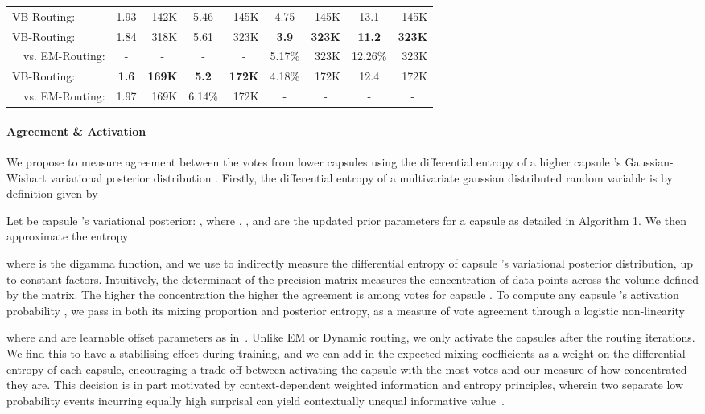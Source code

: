 \documentclass[letterpaper]{article} \usepackage{aaai20}  \usepackage{times}  \usepackage{helvet} \usepackage{courier}  \usepackage[hyphens]{url}  \usepackage{graphicx} \urlstyle{rm} \def\UrlFont{\rm}  \usepackage{graphicx}  \frenchspacing  \setlength{\pdfpagewidth}{8.5in}  \setlength{\pdfpageheight}{11in}  \nocopyright
\begin{document}
\begin{table*}[t]
\begin{tabular}{lcrcrcrcr}
        \midrule
        VB-Routing:  & 1.93 & 142K & 5.46 & 145K & 4.75 & 145K & 13.1 & 145K  \\
        VB-Routing:  & 1.84 & 318K & 5.61 & 323K & \textbf{3.9}\scriptsize{} & \textbf{323K} & \textbf{11.2}\scriptsize{} & \textbf{323K}  \\
        \ \ vs. EM-Routing:  & - & \multicolumn{1}{c}{-} &  - & \multicolumn{1}{c}{-} & 5.17\% & 323K & 12.26\% & 323K  \\
        VB-Routing:  & \textbf{1.6}\scriptsize{} & \textbf{169K} &  \textbf{5.2}\scriptsize{} & \textbf{172K} & 4.18\% & 172K & 12.4 & 172K  \\
        \ \ vs. EM-Routing:  & 1.97 & 169K &  6.14\% & 172K & - & \multicolumn{1}{c}{-} & - & \multicolumn{1}{c}{-} \\
        \bottomrule
    \end{tabular}
    \label{results table}
\end{table*}
\paragraph{Agreement \& Activation}
We propose to measure agreement between the votes from lower capsules  using the differential entropy of a higher capsule 's Gaussian-Wishart variational posterior distribution . Firstly, the differential entropy of a multivariate gaussian distributed random variable  is by definition given by

Let  be capsule 's variational posterior: , where , ,  and  are the updated prior parameters for a capsule  as detailed in Algorithm 1. We then approximate the entropy

where  is the digamma function, and we use  to indirectly measure the differential entropy of capsule 's variational posterior distribution, up to constant factors. Intuitively, the determinant of the precision matrix measures the concentration of data points across the volume defined by the matrix. The higher the concentration the higher the agreement is among votes for capsule . To compute any capsule 's activation probability , we pass in both its mixing proportion and posterior entropy, as a measure of vote agreement through a logistic non-linearity

where  and  are learnable offset parameters as in~\cite{hinton2018matrix}. Unlike EM or Dynamic routing, we only activate the capsules after the routing iterations. We find this to have a stabilising effect during training, and we can add in the expected mixing coefficients as a weight on the differential entropy of each capsule, encouraging a trade-off between activating the capsule with the most votes and our measure of how concentrated they are. This decision is in part motivated by context-dependent weighted information and entropy principles, wherein two separate low probability events incurring equally high surprisal can yield contextually unequal informative value~\cite{guiacsu1971weighted}. 
\end{document}
